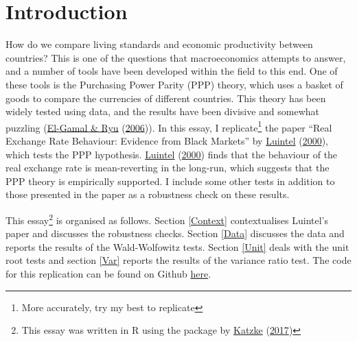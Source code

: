 \documentclass[11pt,preprint, authoryear]{elsarticle}
\numberwithin{equation}{section}
\numberwithin{figure}{section}
\numberwithin{table}{section}
\let\rmarkdownfootnote\footnote%
\def\footnote{\protect\rmarkdownfootnote}
\begin{document}
\renewcommand{\contentsname}{Table of Contents}
{\tableofcontents}

\pagestyle{fancy}
\chead{}
\rhead{}
\lfoot{}
\lhead{}
\cfoot{}


\headsep 35pt %




\newpage

\hypertarget{introduction}{%
\section{\texorpdfstring{Introduction
\label{Introduction}}{Introduction }}\label{introduction}}

How do we compare living standards and economic productivity between
countries? This is one of the questions that macroeconomics attempts to
answer, and a number of tools have been developed within the field to
this end. One of these tools is the Purchasing Power Parity (PPP)
theory, which uses a basket of goods to compare the currencies of
different countries. This theory has been widely tested using data, and
the results have been divisive and somewhat puzzling
(\protect\hyperlink{ref-puz}{El-Gamal \& Ryu}
(\protect\hyperlink{ref-puz}{2006})). In this essay, I
replicate\footnote{More accurately, try my best to replicate} the paper
``Real Exchange Rate Behaviour: Evidence from Black Markets'' by
\protect\hyperlink{ref-Kul}{Luintel}
(\protect\hyperlink{ref-Kul}{2000}), which tests the PPP hypothesis.
\protect\hyperlink{ref-Kul}{Luintel} (\protect\hyperlink{ref-Kul}{2000})
finds that the behaviour of the real exchange rate is mean-reverting in
the long-run, which suggests that the PPP theory is empirically
supported. I include some other tests in addition to those presented in
the paper as a robustness check on these results.

This essay\footnote{This essay was written in R using the package by
  \protect\hyperlink{ref-Texevier}{Katzke}
  (\protect\hyperlink{ref-Texevier}{2017})} is organised as follows.
Section \ref{Context} contextualises Luintel's paper and discusses the
robustness checks. Section \ref{Data} discusses the data and reports the
results of the Wald-Wolfowitz tests. Section \ref{Unit} deals with the
unit root tests and section \ref{Var} reports the results of the
variance ratio test. The code for this replication can be found on
Github \href{https://github.com/cass-code/metrics.git}{here}.
\end{document}
